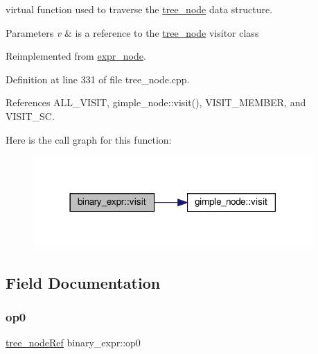 virtual function used to traverse the \hyperlink{classtree__node}{tree\+\_\+node} data structure. 


\begin{DoxyParams}{Parameters}
{\em v} & is a reference to the \hyperlink{classtree__node}{tree\+\_\+node} visitor class \\
\hline
\end{DoxyParams}


Reimplemented from \hyperlink{structexpr__node_aac767878f13ca07371dde2c3938ef38a}{expr\+\_\+node}.



Definition at line 331 of file tree\+\_\+node.\+cpp.



References A\+L\+L\+\_\+\+V\+I\+S\+IT, gimple\+\_\+node\+::visit(), V\+I\+S\+I\+T\+\_\+\+M\+E\+M\+B\+ER, and V\+I\+S\+I\+T\+\_\+\+SC.

Here is the call graph for this function\+:
\nopagebreak
\begin{figure}[H]
\begin{center}
\leavevmode
\includegraphics[width=302pt]{dc/dea/structbinary__expr_a01572c9c6e0d6bee6dadbb1a074cd075_cgraph}
\end{center}
\end{figure}


\subsection{Field Documentation}
\mbox{\label{structbinary__expr_ab341e7e0ed973ac0f28ea0e27cdc76d2}} 
\subsubsection{\texorpdfstring{op0}{op0}}
{\footnotesize\ttfamily \hyperlink{tree__node_8hpp_a6ee377554d1c4871ad66a337eaa67fd5}{tree\+\_\+node\+Ref} binary\+\_\+expr\+::op0}



